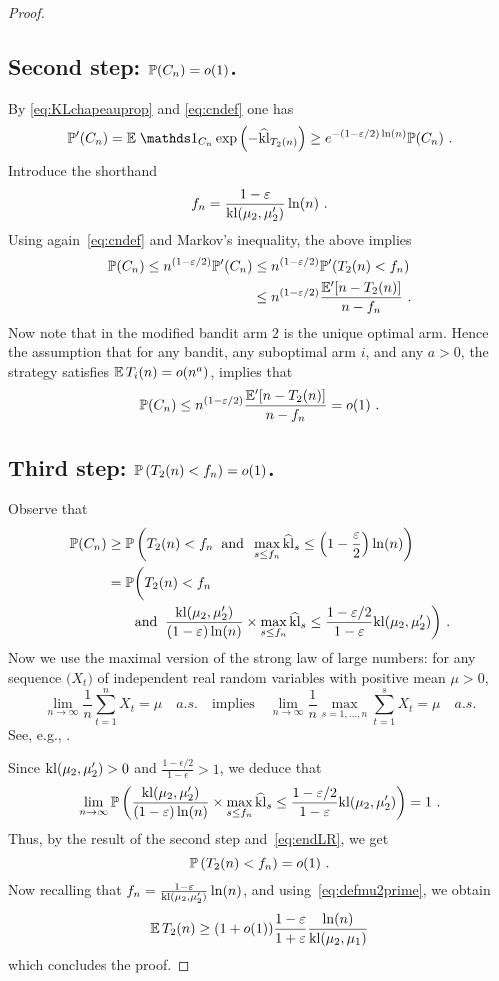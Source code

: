 \begin{proof}
\subsection*{Second step: $\P(C_n) = o(1)$.}
By \eqref{eq:KLchapeauprop} and \eqref{eq:cndef} one has
$$\P'(C_n) = \E \; \ds1_{C_n} \exp\left(- \widehat{\kl}_{T_2(n)} \right) \geq e^{- (1-\epsilon/2) \ln(n)} \P(C_n)~.$$
Introduce the shorthand
\[
    f_n = \frac{1-\epsilon}{\kl(\mu_2,\mu_2')} \ln(n)~.
\]
Using again~\eqref{eq:cndef} and Markov's inequality, the above implies
\begin{align*}
\P(C_n) \leq n^{(1-\epsilon/2)} \P'(C_n)
&\leq n^{(1-\epsilon/2)} \P'(T_2(n) < f_n)
\\ &\leq n^{(1-\epsilon/2)} \frac{\E'[n - T_2(n)]}{n - f_n}~.
\end{align*}
Now note that in the modified bandit arm $2$ is the unique optimal arm. Hence the assumption that for any bandit, any suboptimal arm $i$, and any $a>0$, the strategy satisfies $\E\,T_i(n) = o(n^a)$, implies that
$$\P(C_n) \leq n^{(1-\epsilon/2)} \frac{\E'[n - T_2(n)]}{n - f_n} = o(1)~.$$ 

\subsection*{Third step: $\P\left(T_2(n) < f_n \right) = o(1)$.}
%
Observe that
\begin{align}
    \P(C_n)
& \ge
    \P\left(T_2(n) < f_n \;\; \text{and} \;\; \max_{s \le f_n} \widehat{\kl}_s \leq \left(1-\frac{\epsilon}{2}\right) \ln(n) \right)
\notag
\\&=
    \P\biggl(T_2(n) < f_n
\notag
\\&
    \qquad \text{and} \;\; \frac{\kl(\mu_2,\mu_2')}{(1-\epsilon) \ln(n)} \times \max_{s \le f_n} \widehat{\kl}_s \leq \frac{1-\epsilon/2}{1-\epsilon} \kl(\mu_2, \mu_2') \biggr)~.
\label{eq:endLR}
\end{align}
%
Now we use the maximal version of the strong law of large numbers: for any sequence $\bigl(X_t\bigr)$ of independent real random variables with positive mean $\mu > 0$,
\[
    \lim_{n\to\infty}\frac{1}{n}\sum_{t=1}^n X_t = \mu \quad a.s. \quad\text{implies}\quad
\lim_{n\to\infty}\frac{1}{n}\max_{s=1,\dots,n}\sum_{t=1}^s X_t = \mu \quad a.s.
\]
See, e.g., \cite[Lemma 10.5]{Bub10}.

Since $\kl(\mu_2,\mu_2')>0$ and $\frac{1-\epsilon/2}{1-\epsilon} > 1$, we deduce that
$$\lim_{n \to \infty} \P \left(\frac{\kl(\mu_2,\mu_2')}{(1-\epsilon) \ln(n)} \times \max_{s \le f_n} \widehat{\kl}_s \leq \frac{1-\epsilon/2}{1-\epsilon} \kl(\mu_2, \mu_2') \right) = 1~.$$
Thus, by the result of the second step and~\eqref{eq:endLR}, we get
$$\P\left(T_2(n) < f_n\right) = o(1)~.$$
%
Now recalling that $f_n = \frac{1-\epsilon}{\kl(\mu_2,\mu_2')} \ln(n)$, and using~\eqref{eq:defmu2prime}, we obtain
$$\E\,T_2(n) \geq (1+o(1)) \frac{1-\epsilon}{1+\epsilon} \frac{\ln(n)}{\kl(\mu_2,\mu_1)}$$
which concludes the proof.
\end{proof}

